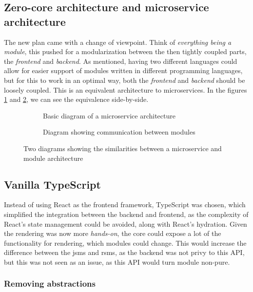 \subsection{Zero-core architecture and microservice architecture}

The new plan came with a change of viewpoint. Think of
\textit{everything being a module}, this pushed for a modularization between the
then tightly coupled parts, the \textit{frontend} and \textit{backend}. As
mentioned, having two different languages could allow for easier support of
modules written in different programming languages, but for this to work in an
optimal way, both the \textit{frontend} and \textit{backend} should be loosely
coupled. This is an equivalent architecture to microservices. In the figures
\ref{sfig:mic} and \ref{sfig:mod}, we can see the equivalence side-by-side.

\begin{figure}[H]
  \begin{subfigure}[h]{0.49\linewidth}
    
    \caption{Basic diagram of a microservice architecture}
    \label{sfig:mic}
  \end{subfigure}
  \hfill
  \begin{subfigure}[h]{0.49\linewidth}
    
    \caption{Diagram showing communication between modules}
    \label{sfig:mod}
  \end{subfigure}
  \caption{
    Two diagrams showing the similarities between a microservice and module
    architecture
  }
  \label{fig:comp}
\end{figure}


\subsection{Vanilla TypeScript}

Instead of using React as the frontend framework, TypeScript was chosen, which
simplified the integration between the backend and frontend, as the complexity
of React's state management could be avoided, along with React's hydration.
Given the rendering was now more \textit{hands-on}, the core could expose a lot
of the functionality for rendering, which modules could change. This would
increase the difference between the \gls*{jsms} and \gls*{rsms}, as the backend
was not privy to this API, but this was not seen as an issue, as this API would
turn module non-pure.

\subsubsection{Removing abstractions}

